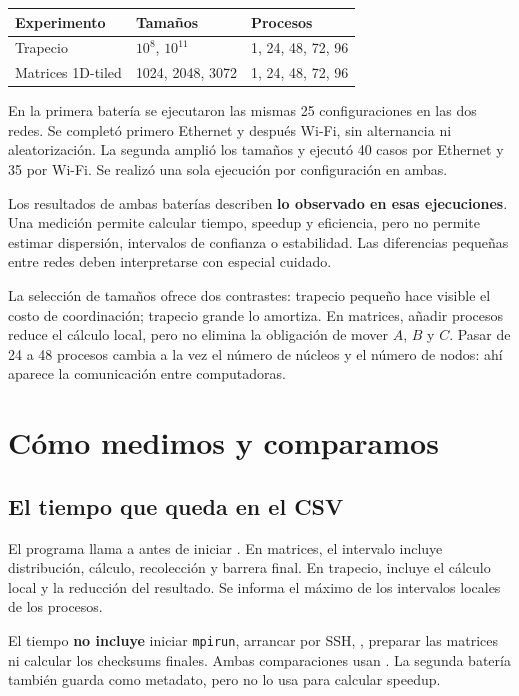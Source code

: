 \begin{center}
\begin{tabular}{lll}
\toprule
Experimento & Tamaños & Procesos \\
\midrule
Trapecio & $10^8$, $10^{11}$ & 1, 24, 48, 72, 96 \\
Matrices 1D-tiled & 1024, 2048, 3072 & 1, 24, 48, 72, 96 \\
\bottomrule
\end{tabular}\end{center}

En la primera batería se ejecutaron las mismas 25 configuraciones en las dos redes. Se completó primero Ethernet y después Wi-Fi, sin alternancia ni aleatorización. La segunda amplió los tamaños y ejecutó 40 casos por Ethernet y 35 por Wi-Fi. Se realizó una sola ejecución por configuración en ambas.

\begin{idea}
Los resultados de ambas baterías describen \textbf{lo observado en esas ejecuciones}. Una medición permite calcular tiempo, speedup y eficiencia, pero no permite estimar dispersión, intervalos de confianza o estabilidad. Las diferencias pequeñas entre redes deben interpretarse con especial cuidado.
\end{idea}

La selección de tamaños ofrece dos contrastes: trapecio pequeño hace visible el costo de coordinación; trapecio grande lo amortiza. En matrices, añadir procesos reduce el cálculo local, pero no elimina la obligación de mover $A$, $B$ y $C$. Pasar de 24 a 48 procesos cambia a la vez el número de núcleos y el número de nodos: ahí aparece la comunicación entre computadoras.

\section{Cómo medimos y comparamos}

\subsection{El tiempo que queda en el CSV}
El programa llama a  antes de iniciar . En matrices, el intervalo incluye distribución, cálculo, recolección y barrera final. En trapecio, incluye el cálculo local y la reducción del resultado. Se informa el máximo de los intervalos locales de los procesos.

El tiempo  \textbf{no incluye} iniciar \texttt{mpirun}, arrancar por SSH, , preparar las matrices ni calcular los checksums finales. Ambas comparaciones usan . La segunda batería también guarda  como metadato, pero no lo usa para calcular speedup.

